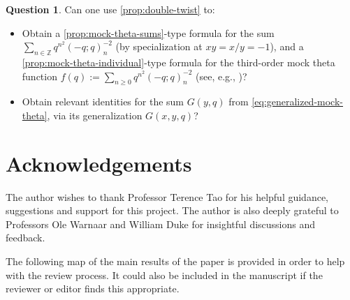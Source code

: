 \documentclass[reqno,11pt]{amsart}
\theoremstyle{definition}
\newtheorem{question}{Question}
\theoremstyle{remark}
\numberwithin{equation}{section}
\newcommand{\Z}{\mathbb{Z}}
\begin{document}
\begin{question} \label{qtn:double-twist}
Can one use \cref{prop:double-twist} to:
\begin{itemize}
    \item[(i).] Obtain a \cref{prop:mock-theta-sums}-type formula for the sum $\sum_{n \in \Z} q^{n^2} (-q; q)_n^{-2}$ (by specialization at $xy = x/y = -1$), and a \cref{prop:mock-theta-individual}-type formula for the third-order mock theta function $f(q) := \sum_{n \ge 0} q^{n^2} (-q; q)_n^{-2}$ (see, e.g., \cite{chen2012partition})?
    \item[(ii).] Obtain relevant identities for the sum $G(y, q)$ from \cref{eq:generalized-mock-theta}, via its generalization $G(x, y, q)$?
\end{itemize}
\end{question}

\section*{Acknowledgements}

The author wishes to thank Professor Terence Tao for his helpful guidance, suggestions and support for this project. The author is also deeply grateful to Professors Ole Warnaar and William Duke for insightful discussions and feedback.

\iffalse
\newpage 

The following map of the main results of the paper is provided in order to help with the review process. It could also be included in the manuscript if the reviewer or editor finds this appropriate.
\end{document}
